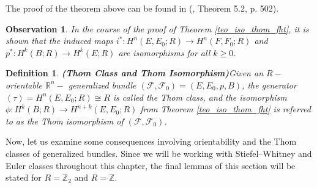 \documentclass[12pt,oneside]{book}
\newtheorem{defi}   {Definition}[chapter]
\newtheorem{lem}    {Lemma}[chapter]
\newtheorem{obs}    {Observation}[chapter]
\newcommand{\R}{\mathbb{R}}
\newcommand{\Z}{\mathbb{Z}}
\begin{document}
    The proof of the theorem above can be found in (\cite{fadell_1}, Theorem 5.2, p. 502).

    \begin{obs}\label{obs_proj_iso}
    	In the course of the proof of Theorem \ref{teo_iso_thom_fht}, it is shown that the induced maps 
        $i^{*}:H^{n}(E,E_{0};R)\to H^{n}(F,F_{0};R)$ and $p^{*}:H^{k}(B;R)\to H^{k}(E;R)$ are isomorphisms for all $k\geq 0$.
    \end{obs}

    \begin{defi}{\bf (Thom Class and Thom Isomorphism)}\label{defi_thom}
    	Given an $R-$orientable $\R^{n}-$ generalized bundle $(\mathcal{F},\mathcal{F}_{0})=(E,E_{0},p,B)$, the generator 
        $(\tau)=H^{n}(E,E_{0};R)\cong R$ is called the Thom class, and the isomorphism 
        $\phi:H^{k}(B;R)\to H^{n+k}(E,E_{0};R)$ from Theorem \ref{teo_iso_thom_fht} is referred to as the Thom 
        isomorphism of $(\mathcal{F},\mathcal{F}_{0})$.
    \end{defi}

    Now, let us examine some consequences involving orientability and the Thom classes of generalized bundles. Since we will be working with 
    Stiefel–Whitney and Euler classes throughout this chapter, the final lemmas of this 
    section will be stated for $R=\Z_{2}$ and $R=\Z$.

\end{document}
